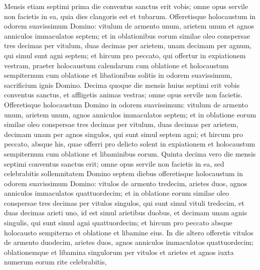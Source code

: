\begin{biblechapter}
\begin{biblechapter}
\begin{biblechapter}
\begin{biblechapter}
\begin{biblechapter}
\begin{biblechapter}
\begin{biblechapter}
\begin{biblechapter}
\begin{biblechapter}
\begin{biblechapter}
\begin{biblechapter}
\begin{biblechapter}
\begin{biblechapter}
\begin{biblechapter}
\begin{biblechapter}
\begin{biblechapter}
\begin{biblechapter}
\begin{biblechapter}
\begin{biblechapter}
\begin{biblechapter}
\begin{biblechapter}
\begin{biblechapter}
\begin{biblechapter}
\begin{biblechapter}
\begin{biblechapter}
\begin{biblechapter}
\begin{biblechapter}
\begin{biblechapter}
\begin{biblechapter}
\verse Mensis etiam septimi prima die conventus sanctus erit vobis; omne opus servile non facietis in ea, quia dies clangoris est et tubarum. 
\verse Offeretisque holocaustum in odorem suavissimum Domino: vitulum de armento unum, arietem unum et agnos anniculos immaculatos septem; 
\verse et in oblationibus eorum similae oleo conspersae tres decimas per vitulum, duas decimas per arietem, 
\verse unam decimam per agnum, qui simul sunt agni septem; 
\verse et hircum pro peccato, qui offertur in expiationem vestram, 
\verse praeter holocaustum calendarum cum oblatione et holocaustum sempiternum cum oblatione et libationibus solitis in odorem suavissimum, sacrificium ignis Domino.
 \verse Decima quoque die mensis huius septimi erit vobis conventus sanctus, et affligetis animas vestras; omne opus servile non facietis. 
\verse Offeretisque holocaustum Domino in odorem suavissimum: vitulum de armento unum, arietem unum, agnos anniculos immaculatos septem; 
\verse et in oblatione eorum similae oleo conspersae tres decimas per vitulum, duas decimas per arietem, 
\verse decimam unam per agnos singulos, qui sunt simul septem agni; 
\verse et hircum pro peccato, absque his, quae offerri pro delicto solent in expiationem et holocaustum sempiternum cum oblatione et libaminibus eorum.
 \verse Quinta decima vero die mensis septimi conventus sanctus erit; omne opus servile non facietis in ea, sed celebrabitis sollemnitatem Domino septem diebus 
\verse offeretisque holocaustum in odorem suavissimum Domino: vitulos de armento tredecim, arietes duos, agnos anniculos immaculatos quattuordecim; 
\verse et in oblatione eorum similae oleo conspersae tres decimas per vitulos singulos, qui sunt simul vituli tredecim, et duas decimas arieti uno, id est simul arietibus duobus, 
\verse et decimam unam agnis singulis, qui sunt simul agni quattuordecim; 
\verse et hircum pro peccato absque holocausto sempiterno et oblatione et libamine eius. 
\verse In die altero offeretis vitulos de armento duodecim, arietes duos, agnos anniculos immaculatos quattuordecim; 
\verse oblationemque et libamina singulorum per vitulos et arietes et agnos iuxta numerum eorum rite celebrabitis, 

\end{biblechapter}
\end{biblechapter}
\end{biblechapter}
\end{biblechapter}
\end{biblechapter}
\end{biblechapter}
\end{biblechapter}
\end{biblechapter}
\end{biblechapter}
\end{biblechapter}
\end{biblechapter}
\end{biblechapter}
\end{biblechapter}
\end{biblechapter}
\end{biblechapter}
\end{biblechapter}
\end{biblechapter}
\end{biblechapter}
\end{biblechapter}
\end{biblechapter}
\end{biblechapter}
\end{biblechapter}
\end{biblechapter}
\end{biblechapter}
\end{biblechapter}
\end{biblechapter}
\end{biblechapter}
\end{biblechapter}
\end{biblechapter}

